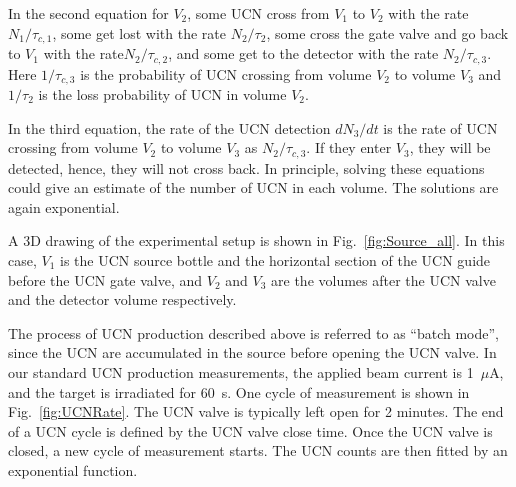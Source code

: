 In the second equation for $V_2$, some UCN cross from $V_1$ to $V_2$
with the rate $N_1/\tau_{c,1}$, some get lost with the rate
$N_2/\tau_2$, some cross the gate valve and go back to $V_1$ with the
rate$N_2/\tau_{c,2}$, and some get to the detector with the rate
$N_2/\tau_{c,3}$. Here $1/\tau_{c,3}$ is the probability of UCN
crossing from volume $V_2$ to volume $V_3$ and $1/\tau_2$ is the loss
probability of UCN in volume $V_2$.



In the third equation, the rate of the UCN detection $dN_3/dt$ is the
rate of UCN crossing from volume $V_2$ to volume $V_3$ as
$N_2/\tau_{c,3}$. If they enter $V_3$, they will be detected, hence,
they will not cross back.  In principle, solving these equations could
give an estimate of the number of UCN in each volume. The solutions
are again exponential.

A 3D drawing of the experimental setup is shown in
Fig.~\ref{fig:Source_all}. In this case, $V_1$ is the UCN source
bottle and the horizontal section of the UCN guide before the UCN gate
valve, and $V_2$ and $V_3$ are the volumes after the UCN valve and the
detector volume respectively.


The process of UCN production described above is referred to as ``batch
mode'', since the UCN are accumulated in the source before opening the
UCN valve.
In our standard UCN production measurements, the applied beam current
is 1~$\mu$A, and the target is irradiated for 60~s. One cycle of
measurement is shown in Fig.~\ref{fig:UCNRate}. The UCN valve is
typically left open for 2 minutes. The end of a UCN cycle is defined
by the UCN valve close time. Once the UCN valve is closed, a new cycle
of measurement starts. The UCN counts are then fitted by an
exponential function.


